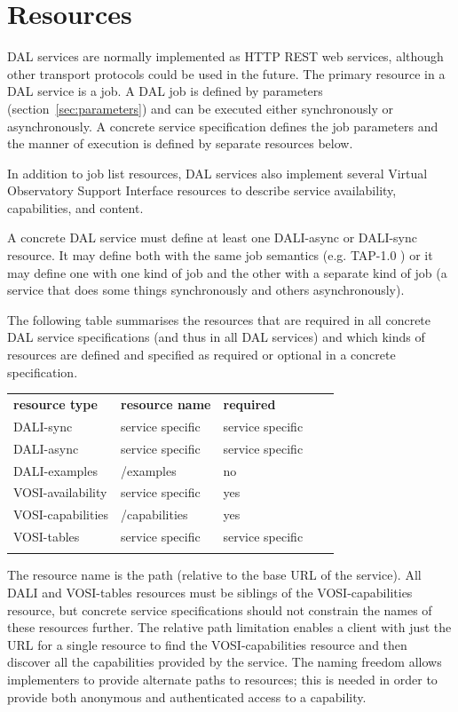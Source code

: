 \documentclass[11pt,letter]{ivoa}
\begin{document}
\section{Resources}
\label{sec:resources}
DAL services are normally implemented as HTTP REST \citep{fielding00} 
web services, although 
other transport protocols could be used in the future. The primary resource in 
a DAL service is a job. A DAL job is defined by parameters 
(section~\ref{sec:parameters}) and 
can be executed either synchronously or asynchronously. A concrete service 
specification defines the job parameters and the manner of execution is defined 
by separate resources below.

In addition to job list resources, DAL services also implement several Virtual 
Observatory Support Interface \citep{std:VOSI} resources to describe 
service availability, capabilities, and content.

A concrete DAL service must define at least one DALI-async or DALI-sync 
resource. It may define both with the same job semantics (e.g. TAP-1.0 
\citep{std:TAP}) or it may define one with one kind of job and the other with a 
separate kind of job (a service that does some things synchronously and others 
asynchronously). 

The following table summarises the resources that are required in all concrete 
DAL service specifications (and thus in all DAL services) and which kinds of 
resources are defined and specified as required or optional in a concrete 
specification.


\begin{tabular}{l l l l l}
\sptablerule
\textbf{resource type} & \textbf{resource name} & \textbf{required} \\
\sptablerule
DALI-sync & service specific & service specific & \\
DALI-async & service specific & service specific & \\
DALI-examples & /examples & no & \\
VOSI-availability & service specific & yes & \\
VOSI-capabilities & /capabilities & yes & \\
VOSI-tables & service specific & service specific & \\
\sptablerule
\label{tab:resources}
\end{tabular}

The resource name is the path (relative to the base URL of the service). All 
DALI and VOSI-tables resources must be siblings of the VOSI-capabilities resource, but 
concrete service specifications should not constrain the names of these resources further.
The relative path limitation enables a client with just the URL for a single resource to 
find the VOSI-capabilities resource and then discover all the capabilities 
provided by the service. The naming freedom allows implementers to provide alternate paths to 
resources; this is needed in order to provide both anonymous and authenticated access to a 
capability. 
\end{document}

